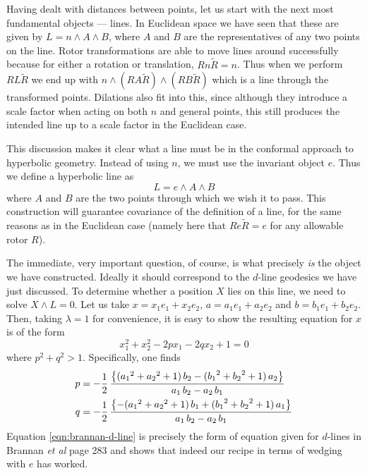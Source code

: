 Having dealt with distances between points, let us start with the
next most fundamental objects --- lines. In Euclidean space we
have seen that these are given by $L = n \wedge A \wedge B$, where $A$
and $B$ are the representatives of any two points on the line.
Rotor transformations are able to move lines around successfully
because for either a rotation or translation, $R n \tilde{R} = n$.
Thus when we perform $R L \tilde{R}$ we end up with $n \wedge (R A \tilde{R})
\wedge (R B \tilde{R})$ which is a line through the transformed points.
Dilations also fit into this, since although they introduce a
scale factor when acting on both $n$ and general points, this
still produces the intended line up to a scale factor in the
Euclidean case.

This discussion makes it clear what a line must be in the
conformal approach to hyperbolic geometry. Instead of
using $n$, we must use the invariant object $e$. Thus we
define a hyperbolic line as
%
\begin{equation}\label{eqn:line-def}
L = e \wedge A \wedge B
\end{equation}
%
where $A$ and $B$ are the two points through which we
wish it to pass. This construction will guarantee
covariance of the definition of a line, for the same
reasons as in the Euclidean case (namely here that $R e
\tilde{R} = e$ for any allowable rotor $R$).

The immediate, very important question, of course, is
what precisely {\em is\/} the object we have constructed.
Ideally it should correspond to the $d$-line geodesics we
have just discussed. To determine whether a position $X$
lies on this line, we need to solve $X\wedge L=0$. Let us
take $x=x_1 e_1 + x_2 e_2$, $a=a_1 e_1 + a_2 e_2$ and
$b=b_1 e_1 + b_2 e_2$. Then, taking $\lambda=1$ for
convenience,  it is easy to show the resulting equation
for $x$ is of the form
%
\begin{equation}\label{eqn:brannan-d-line}
x_1^2+x_2^2-2 p x_1 -2 q x_2 +1 =0
\end{equation}
%
where $p^2+q^2>1$. Specifically, one finds
%
\begin{align}
p &= -\frac{1}{2}\,\frac {\left\{({a_1}^2+{a_2}^2
+1)\,b_2 - ({b_1}^2+{b_2}^2 +1)\,a_2\right\}}{ a_1\, b_2-
a_2\, b_1} \nn \\
%
q &= -\frac{1}{2}\,{\frac {\left\{-({a_1}^2+{a_2}^2
+1)\,b_1 + ({b_1}^2+{b_2}^2 +1)\,a_1\right\}}{{ a_1}\,{
b_2}-{ a_2}\,{ b_1}}} \nn
%
\end{align}
%
Equation \ref{eqn:brannan-d-line} is precisely the form
of equation given for $d$-lines in Brannan \emph{et al}\cite{GEOM:Brannan} 
page 283 and shows that
indeed our recipe in terms of wedging with $e$ has worked.

